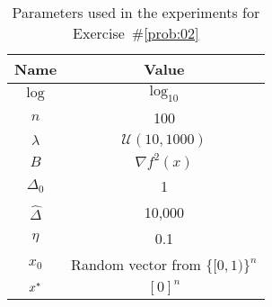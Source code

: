 \begin{table}[h]
  \caption{Parameters used in the experiments for Exercise~\#\ref{prob:02}}\label{tab:p02:experimentParameters}
  \centering
  \begin{tabular}{|c|c|}
    \hline
    \textbf{Name} & \textbf{Value} \\\hline
    \hline
    $\log$      &   $\log_{10}$\\\hline
    $n$         &   100\\\hline
    $\lambda$   &   $\mathcal{U}(10,1000)$ \\\hline
    $B$         &   $\nabla f^2 (x)$ \\\hline
    $\Delta_0$  &   1 \\\hline
    $\hat{\Delta}$& 10,000 \\\hline 
    $\eta$      &   0.1\\\hline
    $x_0$       &   Random vector from $\{[0,1)\}^{n}$\\\hline
    $x^{*}$     &   $[0]^n$\\\hline
  \end{tabular}
\end{table}



